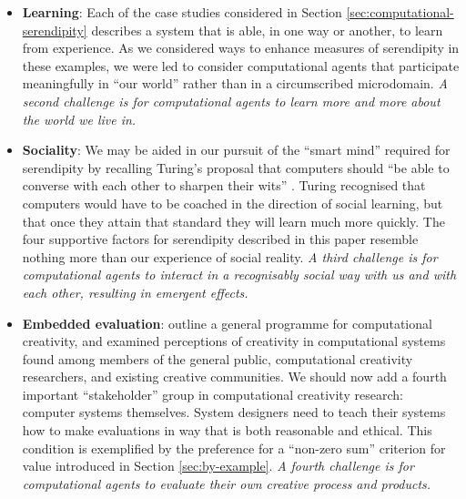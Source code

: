 \begin{itemize}
\item \textbf{Learning}: Each of the case studies considered in
  Section \ref{sec:computational-serendipity} describes a system that
  is able, in one way or another, to learn from experience.  As we
  considered ways to enhance measures of serendipity in these
  examples, we were led to consider computational agents that
  participate meaningfully in ``our world'' rather than in a
  circumscribed microdomain.  \emph{A second challenge is for
    computational agents to learn more and more about the world we
    live in.}
\end{itemize}

\begin{itemize}
\item \textbf{Sociality}: We may be aided in our pursuit of the
  ``smart mind'' required for serendipity by recalling Turing's
  proposal that computers should ``be able to converse with each other
  to sharpen their wits'' \cite{turing-intelligent}.  Turing
  recognised that computers would have to be coached in the direction
  of social learning, but that once they attain that standard they
  will learn much more quickly.  The four supportive factors for
  serendipity described in this paper resemble nothing more than our
  experience of social reality.  \emph{A third challenge is for
    computational agents to interact in a recognisably social way with
    us and with each other, resulting in emergent effects.}
\end{itemize}

\begin{itemize}
\item \textbf{Embedded evaluation}:
   outline a general programme
  for computational creativity, and examined perceptions of creativity
  in computational systems found among members of the general public,
  computational creativity researchers, and existing creative
  communities.  We should now add a fourth important ``stakeholder''
  group in computational creativity research: computer systems
  themselves.  System designers need to teach their systems how to
  make evaluations in way that is both reasonable and ethical.  This
  condition is exemplified by the preference for a ``non-zero sum''
  criterion for value introduced in Section \ref{sec:by-example}.
  \emph{A fourth challenge is for computational agents to evaluate
    their own creative process and products.}
\end{itemize}


